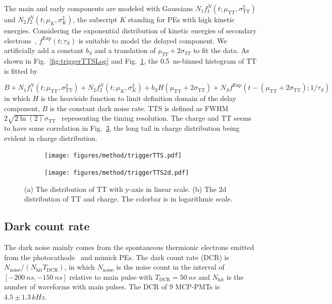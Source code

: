 The main and early components are modeled with Gaussians $N_1f_1^N(t;\mu_{\mathrm{TT}},\sigma_{\mathrm{TT}}^2)$ and $N_2f_2^N(t;\mu_K,\sigma_K^2)$, the subscript $K$ standing for PEs with high kinetic energies. Considering the exponential distribution of kinetic energies of secondary electrons~\cite{Furman,SecondElectron}, $f^\mathrm{Exp}(t;\tau_S)$ is suitable to model the delayed component.  We artificially add a constant $b_S$ and a translation of $\mu_{TT} + 2\sigma_{TT}$ to fit the data. As shown in Fig.~\ref{fig:triggerTTSLog} and Fig.~\ref{fig:triggerTTS}, the \SI{0.5}{ns}-binned histogram of $\mathrm{TT}$ is fitted by

\begin{equation}
    B+N_1f_1^N(t;\mu_{\mathrm{TT}},\sigma_{\mathrm{TT}}^2)+N_2f_2^N(t;\mu_K,\sigma_K^2)+b_SH(\mu_{\mathrm{TT}}+2\sigma_{\mathrm{TT}})+N_Sf^{\mathrm{Exp}}(t-(\mu_{\mathrm{TT}}+2\sigma_{\mathrm{TT}});1/\tau_S)
\end{equation}
in which $H$ is the heaviside function to limit definition domain of the delay component, $B$ is the constant dark noise rate. TTS is defined as FWHM $2\sqrt{2\ln(2)}\sigma_{\mathrm{TT}}$~\cite{HAMAMATSUManual} representing the timing resolution. The charge and TT seems to have some correlation in Fig.~\ref{fig:triggerTTS2d}, the long tail in charge distribution being evident in charge distribution.

\begin{figure}[!htbp]
    \centering
    \begin{subfigure}[t]{\SF\textwidth}
        \texttt{[image: figures/method/triggerTTS.pdf]}
        \caption{}%
        \label{fig:triggerTTS}
    \end{subfigure}
    \begin{subfigure}[t]{\SF\textwidth}
        \texttt{[image: figures/method/triggerTTS2d.pdf]}
        \caption{}%
        \label{fig:triggerTTS2d}
    \end{subfigure}
    \caption{(a) The distribution of TT with y-axis in linear scale. (b) The 2d distribution of TT and charge. The colorbar is in logarithmic scale.}
\end{figure}

\subsection{Dark count rate}
\label{sec:dcr}
The dark noise mainly comes from the spontaneous thermionic electrons emitted from the photocathode~\cite{KM3NetTesting} and mimick PEs. The dark count rate (DCR) is ${N_{\mathrm{noise}}}/({N_{\mathrm{hit}}T_{\mathrm{DCR}}})$, in which $N_{\mathrm{noise}}$ is the noise count in the interval of $[\SI{-200}{ns},\SI{-150}{ns}]$ relative to main pulse with $T_{\mathrm{DCR}}=\SI{50}{ns}$ and $N_{\mathrm{hit}}$ is the number of waveforms with main pulses. The DCR of 9 MCP-PMTs is $4.5\pm1.3\,\si{kHz}$.


